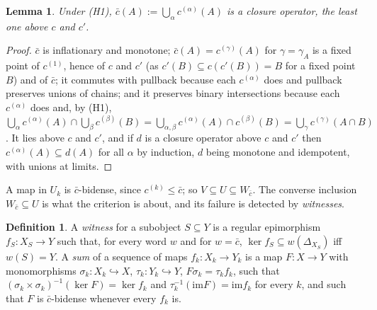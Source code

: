 \documentclass[11pt]{amsart}
\newtheorem{lem}[thm]{Lemma}
\theoremstyle{definition}
\newtheorem{defi}[thm]{Definition}
\newcommand{\im}{\mathrm{im}}
\begin{document}
\begin{lem}\label{lem:joinK}
Under (H1), $\bar c(A):=\bigcup_\alpha c^{(\alpha)}(A)$ is a closure
operator, the least one above $c$ and $c'$.
\end{lem}
\begin{proof}
$\bar c$ is inflationary and monotone; $\bar c(A)=c^{(\gamma)}(A)$ for
$\gamma=\gamma_A$ is a fixed point of $c^{(1)}$, hence of $c$ and $c'$ (as
$c'(B)\subseteq c(c'(B))=B$ for a fixed point $B$) and of $\bar c$; it
commutes with pullback because each $c^{(\alpha)}$ does and pullback
preserves unions of chains; and it preserves binary intersections because
each $c^{(\alpha)}$ does and, by (H1),
$\bigcup_\alpha c^{(\alpha)}(A)\cap\bigcup_\beta c^{(\beta)}(B)=
\bigcup_{\alpha,\beta}c^{(\alpha)}(A)\cap c^{(\beta)}(B)=\bigcup_\gamma
c^{(\gamma)}(A\cap B)$. It lies above $c$ and $c'$, and if $d$ is a closure
operator above $c$ and $c'$ then $c^{(\alpha)}(A)\subseteq d(A)$ for all
$\alpha$ by induction, $d$ being monotone and idempotent, with unions at
limits.
\end{proof}

A map in $U_k$ is $\bar c$-bidense, since $c^{(k)}\le\bar c$; so
$V\subseteq U\subseteq W_{\bar c}$. The converse inclusion $W_{\bar c}\subseteq U$
is what the criterion is about, and its failure is detected by
\emph{witnesses}.

\begin{defi}\label{def:witness}
A \emph{witness} for a subobject $S\subseteq Y$ is a regular epimorphism
$f_S\colon X_S\to Y$ such that, for every word $w$ and for $w=\bar c$,
$\ker f_S\subseteq w(\Delta_{X_S})$ iff $w(S)=Y$. A \emph{sum} of a sequence
of maps $f_k\colon X_k\to Y_k$ is a map $F\colon X\to Y$ with monomorphisms
$\sigma_k\colon X_k\hookrightarrow X$, $\tau_k\colon Y_k\hookrightarrow Y$,
$F\sigma_k=\tau_kf_k$, such that $(\sigma_k\times\sigma_k)^{-1}(\ker F)=
\ker f_k$ and $\tau_k^{-1}(\im F)=\im f_k$ for every $k$, and such that
$F$ is $\bar c$-bidense whenever every $f_k$ is.
\end{defi}
\end{document}
